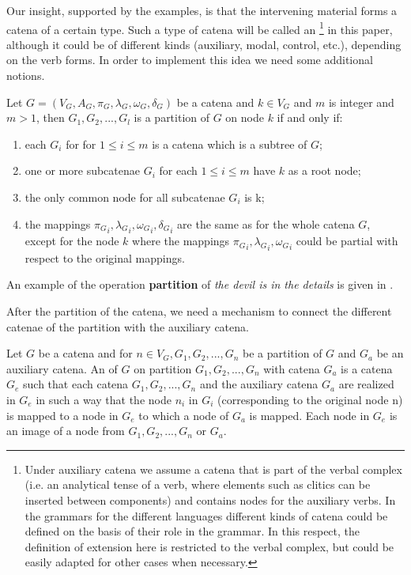 \documentclass[output=paper,colorlinks,citecolor=brown]{langscibook}
\begin{document}
Our insight, supported by the examples, is that the intervening material forms a catena of a certain type. Such a type of catena will be called an \footnote{Under auxiliary catena we assume a catena that is part of the verbal complex (i.e. an analytical tense of a verb, where elements such as clitics can be inserted between components) and contains nodes for the auxiliary verbs. In the grammars for the different languages different kinds of catena could be defined on the basis of their role in the grammar. In this respect, the definition of extension here is restricted to the verbal complex, but could be easily adapted for other cases when necessary.} in this paper, although it could be of different kinds (auxiliary, modal, control, etc.), depending on the verb forms. In order to implement this idea we need some additional notions.

Let $G = (V_G,A_G,\pi_G,\lambda_G, \omega_G, \delta_G)$ be a catena and $k \in V_G$ and $m$ is integer and $m > 1$, then $G_1, G_2, ..., G_l$ is a partition of $G$ on node $k$ if and only if:
\begin{enumerate}

\item each $G_i$ for for $1 \leq i \leq  m$ is a catena which is a subtree of $G$;

\item one or more subcatenae $G_i$ for each $1 \leq i \leq  m$ have $k$ as a root node;

\item the only common node for all subcatenae $G_i$ is k;

\item the mappings ${\pi_G}_i, {\lambda_G}_i, {\omega_G}_i, {\delta_G}_i$ are the same as for the whole catena $G$, except for the node $k$ where the mappings ${\pi_G}_i, {\lambda_G}_i, {\omega_G}_i$ could be partial with respect to the original mappings.


\end{enumerate}

An example of the operation \textbf{partition} of \textit{the devil is in the details} is given in .

After the partition of the catena, we need a mechanism to connect the different catenae of the partition with the auxiliary catena.


Let $G$ be a catena and for $n \in V_G, G_1, G_2, ..., G_n$ be a partition of $G$ and $G_a$ be an auxiliary catena. An  of $G$ on partition $G_1, G_2, ..., G_n$ with catena $G_a$ is a catena $G_e$ such that each catena $G_1, G_2, ..., G_n$ and the auxiliary catena $G_a$ are realized in $G_e$ in such a way that the node $n_i$ in $G_i$ (corresponding to the original node n) is mapped to a node in $G_e$ to which a node of $G_a$ is mapped. Each node in $G_e$ is an image of a node from $G_1, G_2, ..., G_n$ or $G_a$.\largerpage[1.5]
\end{document}
